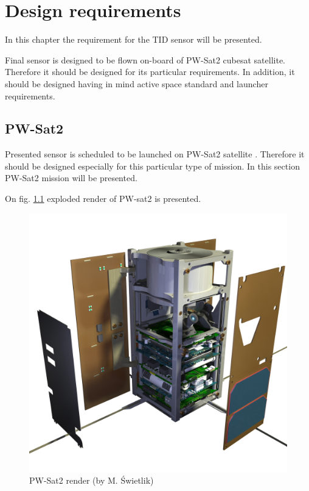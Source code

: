 \chapter{Design requirements}
\label{Design_requirements}

In this chapter the requirement for the TID sensor will be presented.

Final sensor is designed to be flown on-board of PW-Sat2 cubesat satellite. Therefore it should be designed for its particular requirements. In addition, it should be designed having in mind active space standard and launcher requirements.


\section{PW-Sat2}
    Presented sensor is scheduled to be launched on PW-Sat2 satellite \cite{PW-Sat2URL}. Therefore it should be designed especially for this particular type of mission. In this section PW-Sat2 mission will be presented.

    On fig. \ref{PW-Sat_render_01} exploded render of PW-sat2 is presented.

    \begin{figure}[h]
        \centering
        \includegraphics[width=0.5\paperwidth]{img/PW-Sat2_render_01.png}
        \caption{PW-Sat2 render (by M. Świetlik)}
        \label{PW-Sat_render_01}
    \end{figure}

